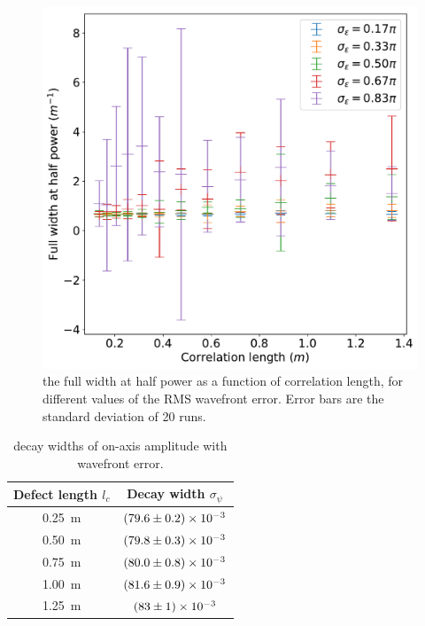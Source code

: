 \documentclass{article}
\begin{document}
\begin{figure}
    \centering
    \begin{minipage}{0.48\textwidth}
        \centering
        \includegraphics[width=\textwidth]{pictures/corr/fwhp.pdf}
    \end{minipage}\hfill
    \begin{minipage}{0.48\textwidth}
        \caption{the full width at half power as a function of correlation length, for different values of the RMS wavefront error. Error bars are the standard deviation of 20 runs.}\label{fig:corr:fwhp}
    \end{minipage}
\end{figure}

\begin{table}[!h]
    \centering
    \begin{tabular}{ c | c }
        Defect length $l_c$ & Decay width $\sigma_\psi$ \\
        \hline
        \SI{0.25}{m} & $\num{79.6 \pm 0.2 e-3}$ \\
        \SI{0.50}{m} & $\num{79.8 \pm 0.3 e-3}$ \\
        \SI{0.75}{m} & $\num{80.0 \pm 0.8 e-3}$ \\
        \SI{1.00}{m} & $\num{81.6 \pm 0.9 e-3}$ \\
        \SI{1.25}{m} & $\num{83 \pm 1 e-3}$ \\
    \end{tabular}
    \caption{decay widths of on-axis amplitude with wavefront error.}\label{tab:corr-amp}
\end{table}
\end{document}
